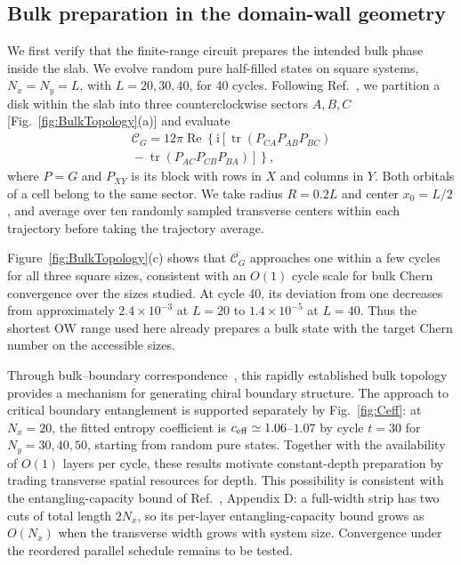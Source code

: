 \documentclass[aps,prb,10pt,twocolumn,superscriptaddress,longbibliography,floatfix]{revtex4-2}
\newcommand{\ii}{\mathrm{i}}
\newcommand{\mc}[1]{\mathcal{#1}}
\newcommand{\claudeadd}[1]{{\color{orange}#1}}
\begin{document}
{\color{blue}
\subsection{Bulk preparation in the domain-wall geometry}
\label{sec:BulkTopology}

We first verify that the finite-range circuit prepares the intended bulk phase inside the slab. We evolve random pure half-filled states on square systems, $N_x=N_y=L$, with $L=20,30,40$, for 40 cycles. Following Ref.~\cite{Kitaev2006}, we partition a disk within the slab into three counterclockwise sectors $A,B,C$ [Fig.~\ref{fig:BulkTopology}(a)] and evaluate
\begin{align}
    \mc C_G=12\pi\operatorname{Re}\!\left\{\ii\left[\operatorname{tr}(P_{CA}P_{AB}P_{BC})\right.\right.\nonumber\\
    \left.\left.{}-\operatorname{tr}(P_{AC}P_{CB}P_{BA})\right]\right\},
    \label{eq:KitaevChern}
\end{align}
where \claudeadd{$P=G$} and $P_{XY}$ is its block with rows in $X$ and columns in $Y$. Both orbitals of a cell belong to the same sector. We take radius $R=0.2L$ and center $x_0=L/2$, and average over ten randomly sampled transverse centers within each trajectory before taking the trajectory average.

Figure~\ref{fig:BulkTopology}(c) shows that $\overline{\mc C_G}$ approaches one within a few cycles for all three square sizes, consistent with an $O(1)$ cycle scale for bulk Chern convergence over the sizes studied. At cycle 40, its deviation from one decreases from approximately $2.4\times10^{-3}$ at $L=20$ to $1.4\times10^{-5}$ at $L=40$. Thus the shortest OW range used here already prepares a bulk state with the target Chern number on the accessible sizes.

Through bulk--boundary correspondence~\cite{Hatsugai1993}, this rapidly established bulk topology provides a mechanism for generating chiral boundary structure. The approach to critical boundary entanglement is supported separately by Fig.~\ref{fig:Ceff}: at $N_x=20$, the fitted entropy coefficient is $c_{\rm eff}\simeq1.06$--$1.07$ by cycle $t=30$ for $N_y=30,40,50$, starting from random pure states. Together with the availability of $O(1)$ layers per cycle, these results motivate constant-depth preparation by trading transverse spatial resources for depth. This possibility is consistent with the entangling-capacity bound of Ref.~\cite{LuLessaKimHsieh2022}, Appendix D: a full-width strip has two cuts of total length $2N_x$, so its per-layer entangling-capacity bound grows as $O(N_x)$ when the transverse width grows with system size. Convergence under the reordered parallel schedule remains to be tested.

}
\end{document}
